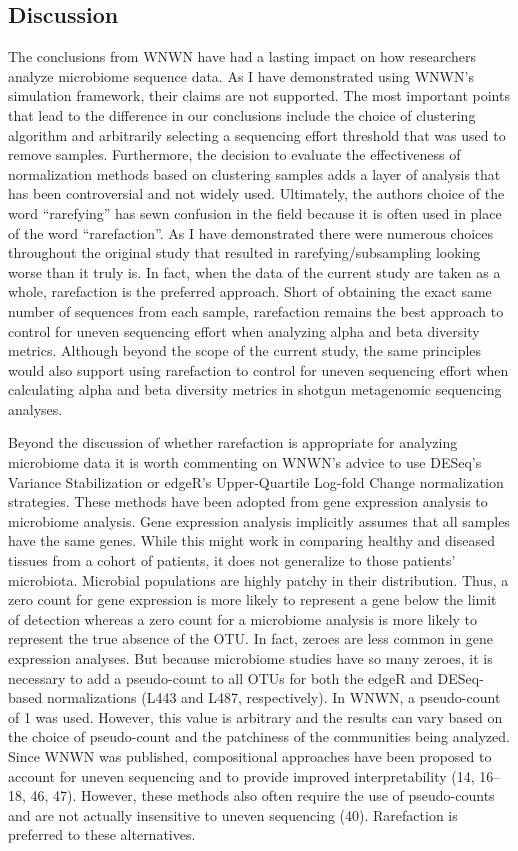 \documentclass[
]{article}
\begin{document}
\hypertarget{discussion}{%
\subsection{Discussion}\label{discussion}}

The conclusions from WNWN have had a lasting impact on how researchers
analyze microbiome sequence data. As I have demonstrated using WNWN's
simulation framework, their claims are not supported. The most important
points that lead to the difference in our conclusions include the choice
of clustering algorithm and arbitrarily selecting a sequencing effort
threshold that was used to remove samples. Furthermore, the decision to
evaluate the effectiveness of normalization methods based on clustering
samples adds a layer of analysis that has been controversial and not
widely used. Ultimately, the authors choice of the word ``rarefying''
has sewn confusion in the field because it is often used in place of the
word ``rarefaction''. As I have demonstrated there were numerous choices
throughout the original study that resulted in rarefying/subsampling
looking worse than it truly is. In fact, when the data of the current
study are taken as a whole, rarefaction is the preferred approach. Short
of obtaining the exact same number of sequences from each sample,
rarefaction remains the best approach to control for uneven sequencing
effort when analyzing alpha and beta diversity metrics. Although beyond
the scope of the current study, the same principles would also support
using rarefaction to control for uneven sequencing effort when
calculating alpha and beta diversity metrics in shotgun metagenomic
sequencing analyses.

Beyond the discussion of whether rarefaction is appropriate for
analyzing microbiome data it is worth commenting on WNWN's advice to use
DESeq's Variance Stabilization or edgeR's Upper-Quartile Log-fold Change
normalization strategies. These methods have been adopted from gene
expression analysis to microbiome analysis. Gene expression analysis
implicitly assumes that all samples have the same genes. While this
might work in comparing healthy and diseased tissues from a cohort of
patients, it does not generalize to those patients' microbiota.
Microbial populations are highly patchy in their distribution. Thus, a
zero count for gene expression is more likely to represent a gene below
the limit of detection whereas a zero count for a microbiome analysis is
more likely to represent the true absence of the OTU. In fact, zeroes
are less common in gene expression analyses. But because microbiome
studies have so many zeroes, it is necessary to add a pseudo-count to
all OTUs for both the edgeR and DESeq-based normalizations (L443 and
L487, respectively). In WNWN, a pseudo-count of 1 was used. However,
this value is arbitrary and the results can vary based on the choice of
pseudo-count and the patchiness of the communities being analyzed. Since
WNWN was published, compositional approaches have been proposed to
account for uneven sequencing and to provide improved interpretability
(14, 16--18, 46, 47). However, these methods also often require the use
of pseudo-counts and are not actually insensitive to uneven sequencing
(40). Rarefaction is preferred to these alternatives.
\end{document}
